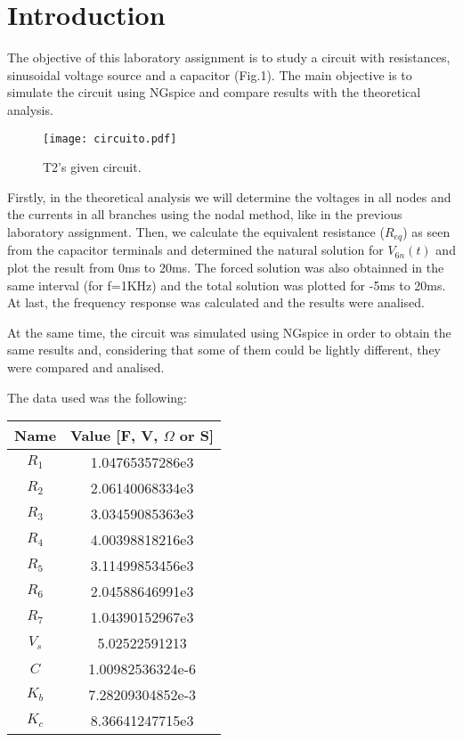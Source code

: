 \section{Introduction}
\label{sec:introduction}

The objective of this laboratory assignment is to study a circuit with resistances, sinusoidal voltage source and a capacitor (Fig.1). The main objective is to simulate the circuit using NGspice and compare results with the theoretical analysis. \par

\begin{figure}[H] \centering
\texttt{[image: circuito.pdf]}
\caption{T2's given circuit.}
\label{fig:circuito}
\end{figure}

Firstly, in the theoretical analysis we will determine the voltages in all nodes and the currents in all branches using the nodal method, like in the previous laboratory assignment. Then, we calculate the equivalent resistance ($R_{eq}$) as seen from the capacitor terminals and determined the natural solution for $V_{6n}(t)$ and plot the result from 0ms to 20ms. The forced solution was also obtainned in the same interval (for f=1KHz) and the total solution was plotted for -5ms to 20ms. At last, the frequency response was calculated and the results were analised. \par
At the same time, the circuit was simulated using NGspice in order to obtain the same results and, considering that some of them could be lightly different, they were compared and analised.\par
The data used was the following:
\begin{center}
  \begin{tabular}{ | c | c | }
    \hline    
    {\bf Name} & {\bf Value [F, V, $\Omega$ or S]} \\ \hline
    $R_1$ & 1.04765357286e3 \\ \hline 
    $R_2$ & 2.06140068334e3 \\ \hline 
    $R_3$ & 3.03459085363e3 \\ \hline 
    $R_4$ & 4.00398818216e3 \\ \hline 
    $R_5$ & 3.11499853456e3 \\ \hline 
    $R_6$ & 2.04588646991e3 \\ \hline 
    $R_7$ & 1.04390152967e3 \\ \hline 
    $V_s$ & 5.02522591213 \\ \hline 
    $C$ & 1.00982536324e-6 \\ \hline
    $K_b$ & 7.28209304852e-3 \\ \hline
    $K_c$ & 8.36641247715e3 \\ 
    \hline
  \end{tabular}
\end{center}




